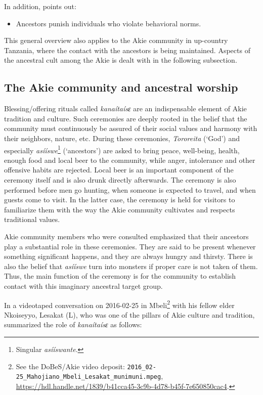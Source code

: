 \documentclass[output=paper,colorlinks,citecolor=brown]{langscibook}
\begin{document}
\noindent In addition, \citet[365]{Ferraro2005} points out: 

\begin{itemize}
    \item Ancestors punish individuals who violate behavioral norms.
\end{itemize}

\noindent This general overview also applies to the Akie community in up-country Tanzania, where the contact with the ancestors is being maintained. Aspects of the ancestral cult among the Akie is dealt with in the following subsection.

\subsection{The Akie community and ancestral worship}\label{sec:legere:3.2}
\begin{sloppypar}
Blessing/offering rituals called \textit{kanaítaísɛ} are an indispensable element of Akie tradition and culture. Such ceremonies are deeply rooted in the belief that the community must continuously be assured of their social values and harmony with their neighbors, nature, etc. During these ceremonies, \textit{Tororeita} (‘God’) and especially \textit{asííswe}\footnote{Singular \textit{asííswante}.} (‘ancestors’) are asked to bring peace, well-being, health, enough food and local beer to the community, while anger, intolerance and other offensive habits are rejected. Local beer is an important component of the ceremony itself and is also drunk directly afterwards. The ceremony is also performed before men go hunting, when someone is expected to travel, and when guests come to visit. In the latter case, the ceremony is held for visitors to familiarize them with the way the Akie community cultivates and respects traditional values.
\end{sloppypar}

Akie community members who were consulted emphasized that their ancestors play a substantial role in these ceremonies. They are said to be present whenever something significant happens, and they are always hungry and thirsty. There is also the belief that \textit{asííswe} turn into monsters if proper care is not taken of them. Thus, the main function of the ceremony is for the community to establish contact with this imaginary ancestral target group. 

In a videotaped conversation on 2016-02-25 in Mbeli\footnote{See the DoBeS/Akie video deposit: \texttt{2016\_02-25\_Mahojiano\_Mbeli\_Lesakat\_munimuni.mpeg},
\url{https://hdl.handle.net/1839/b41cca45-3c9b-4d78-b45f-7e650850cac4}.} with his fellow elder Nkoiseyyo,  Lesakat (L), who was one of the pillars of Akie culture and tradition, summarized the role of \textit{kanaítaísɛ} as follows:
\end{document}
